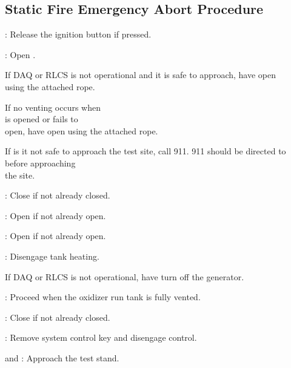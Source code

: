 \subsection{Static Fire Emergency Abort Procedure}
\begin{checklist}
    \item \rlcs{}: Release the ignition button if pressed. 
    \item \rlcs{}: Open \oxdrain{}. 
    \begin{checklist}[label=$\bullet$]
            \item If DAQ or RLCS is not operational and it is safe to approach, have \primary{} open \\ \phantom{} \hspace{7ex} \moxdrain{} using the attached rope. 
            \item If no venting occurs when \\ \phantom{} \hspace{7ex} \moxdrain{} is opened or \moxdrain{} fails to \\ \phantom{} \hspace{7ex} open, have \primary{} open \ohshit{} using the attached rope.
            \item If is it not safe to approach the test site, call 911. 911 should be directed to \ops{} before approaching \\ \phantom{} \hspace{7ex} the site. 
    \end{checklist}
    \item \rlcs{}: Close \oxfill{} if not already closed. 
    \item \rlcs{}: Open \vent{} if not already open. 
    \item \rlcs{}: Open \oxiso{} if not already open.
    \item \rlcs{}: Disengage tank heating.
    \begin{checklist}[label=$\bullet$]
            \item If DAQ or RLCS is not operational, have \primary{} turn off the generator.
    \end{checklist}
    \item \ops{}: Proceed when the oxidizer run tank is fully vented.
    \item \rlcs{}: Close \inj{} if not already closed.
    \item \rlcs{}: Remove system control key and disengage control. 
    \item \primary{} and \secondary{}: Approach the test stand. 

\end{checklist}
